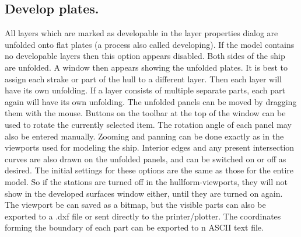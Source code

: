 \documentclass[12pt]{article}
\begin{document}
\subsection{Develop plates.} \label{develop-plates}
All layers which are marked as developable in the layer properties
dialog are unfolded onto flat plates (a process also called
developing). If the model contains no developable layers then this
option appears disabled. Both sides of the ship are unfolded. A window
then appears showing the unfolded plates. It is best to assign each
strake or part of the hull to a different layer. Then each layer will
have its own unfolding. If a layer consists of multiple separate
parts, each part again will have its own unfolding. The unfolded
panels can be moved by dragging them with the mouse.  Buttons on the
toolbar at the top of the window can be used to rotate the currently
selected item.  The rotation angle of each panel may also be entered
manually. Zooming and panning can be done exactly as in the viewports
used for modeling the ship. Interior edges and any present
intersection curves are also drawn on the unfolded panels, and can be
switched on or off as desired. The initial settings for these options
are the same as those for the entire model. So if the stations are
turned off in the hullform-viewports, they will not show in the
developed surfaces window either, until they are turned on again.  The
viewport be can saved as a bitmap, but the visible parts can also be
exported to a .dxf file or sent directly to the printer/plotter. The
coordinates forming the boundary of each part can be exported to n
ASCII text file.
\end{document}
